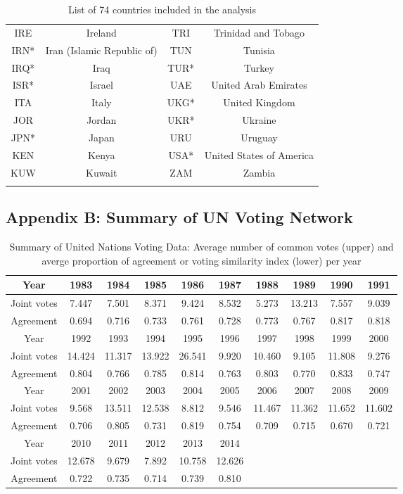 \documentclass[a4paper]{article}
\begin{document}
\begin{table}[H]
\begin{tabular}{c|c||c|c}
				IRE & Ireland&TRI & Trinidad and Tobago\\
				IRN* & Iran (Islamic Republic of)&TUN & Tunisia\\
				IRQ* & Iraq&TUR*& Turkey\\
				ISR* & Israel&UAE & United Arab Emirates\\
				ITA & Italy&UKG* & United Kingdom\\
				JOR & Jordan&UKR* & Ukraine\\
				JPN* & Japan&URU & Uruguay\\
				KEN & Kenya&USA* & United States of America\\
				KUW & Kuwait&ZAM & Zambia\\
				\hline
	\label{table:importantvotes}
\end{tabular}
	\caption {List of 74 countries included in the analysis}
\end{table}
\subsection*{Appendix B: Summary of UN Voting Network}
\begin{table}[ht]
	\centering
	\begin{tabular}{ |c|c|c|c|c|c|c|c|c|c|} 
		\hline
		{Year}	& 1983 & 1984& 1985& 1986 & 1987& 1988& 1989&1990&1991\\ \hline
		Joint votes & 7.447&7.501&8.371&9.424&8.532&5.273&13.213&7.557&9.039\\\hline
		Agreement & 0.694& 0.716 & 0.733 & 0.761 & 0.728 & 0.773 & 0.767 & 0.817 & 0.818\\\hline\hline 
		{Year}	& 1992&1993& 1994 & 1995& 1996& 1997 & 1998& 1999& 2000\\ \hline
		Joint votes  &14.424&11.317&13.922&26.541&9.920&10.460&9.105&11.808&9.276\\\hline
		Agreement & 0.804&0.766& 0.785 & 0.814 & 0.763& 0.803 & 0.770& 0.833 & 0.747\\\hline\hline
		{Year}	&2001&2002&2003&2004&2005& 2006& 2007& 2008&  2009\\ \hline
		Joint votes &9.568&13.511&12.538&8.812&9.546&11.467&11.362&11.652&11.602\\\hline
		Agreement &0.706 & 0.805& 0.731& 0.819& 0.754& 0.709& 0.715&0.670&0.721\\
		\hline\hline
		Year & 2010& 2011&2012&2013&2014&&&&\\\hline
		Joint votes&12.678&9.679&7.892&10.758&12.626&&&&\\\hline
		Agreement&  0.722& 0.735& 0.714 &0.739&0.810&&&&\\\hline
	\end{tabular}
	\caption {Summary of United Nations Voting Data: Average number of common votes (upper) and averge proportion of agreement or voting similarity index (lower) per year}
	\label{table:EDA}
\end{table}
\end{document}

